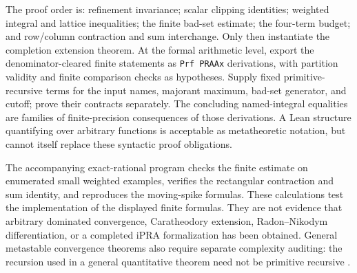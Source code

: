 The proof order is: refinement invariance; scalar clipping identities;
weighted integral and lattice inequalities; the finite bad-set estimate;
the four-term budget; and row/column contraction and sum interchange.
Only then instantiate the completion extension theorem.  At the formal
arithmetic level, export the denominator-cleared finite statements as
\texttt{Prf PRAAx} derivations, with partition validity and finite comparison
checks as hypotheses.  Supply fixed primitive-recursive terms for the input
names, majorant maximum, bad-set generator, and cutoff; prove their contracts
separately.  The concluding named-integral equalities are families of
finite-precision consequences of those derivations.  A Lean structure
quantifying over arbitrary functions is acceptable as metatheoretic notation,
but cannot itself replace these syntactic proof obligations.

The accompanying exact-rational program checks the finite estimate on
enumerated small weighted examples, verifies the rectangular contraction and
sum identity, and reproduces the moving-spike formulas.  These calculations
test the implementation of the displayed finite formulas.  They are not
evidence that arbitrary dominated convergence, Caratheodory extension,
Radon--Nikodym differentiation, or a completed iPRA formalization has been
obtained.  General metastable convergence theorems also require separate
complexity auditing: the recursion used in a general quantitative theorem
need not be primitive recursive \cite{measureADRMeta2012}.
